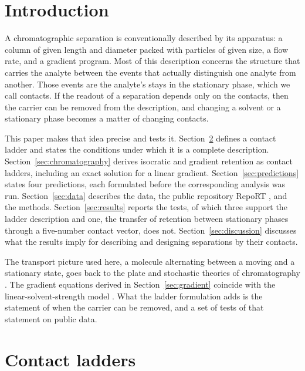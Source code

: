 \documentclass[11pt,a4paper]{article}
\theoremstyle{definition}
\theoremstyle{remark}
\begin{document}
\tableofcontents

\section{Introduction}
\label{sec:intro}

A chromatographic separation is conventionally described by its apparatus: a column of given length and diameter packed with particles of given size, a flow rate, and a gradient program.
Most of this description concerns the structure that carries the analyte between the events that actually distinguish one analyte from another.
Those events are the analyte's stays in the stationary phase, which we call contacts.
If the readout of a separation depends only on the contacts, then the carrier can be removed from the description, and changing a solvent or a stationary phase becomes a matter of changing contacts.

This paper makes that idea precise and tests it.
Section~\ref{sec:ladders} defines a contact ladder and states the conditions under which it is a complete description.
Section~\ref{sec:chromatography} derives isocratic and gradient retention as contact ladders, including an exact solution for a linear gradient.
Section~\ref{sec:predictions} states four predictions, each formulated before the corresponding analysis was run.
Section~\ref{sec:data} describes the data, the public repository RepoRT \citep{kretschmer2024}, and the methods.
Section~\ref{sec:results} reports the tests, of which three support the ladder description and one, the transfer of retention between stationary phases through a five-number contact vector, does not.
Section~\ref{sec:discussion} discusses what the results imply for describing and designing separations by their contacts.

The transport picture used here, a molecule alternating between a moving and a stationary state, goes back to the plate and stochastic theories of chromatography \citep{martin1941,giddings1955}.
The gradient equations derived in Section~\ref{sec:gradient} coincide with the linear-solvent-strength model \citep{snyder2007}.
What the ladder formulation adds is the statement of when the carrier can be removed, and a set of tests of that statement on public data.

\section{Contact ladders}
\label{sec:ladders}
\end{document}
